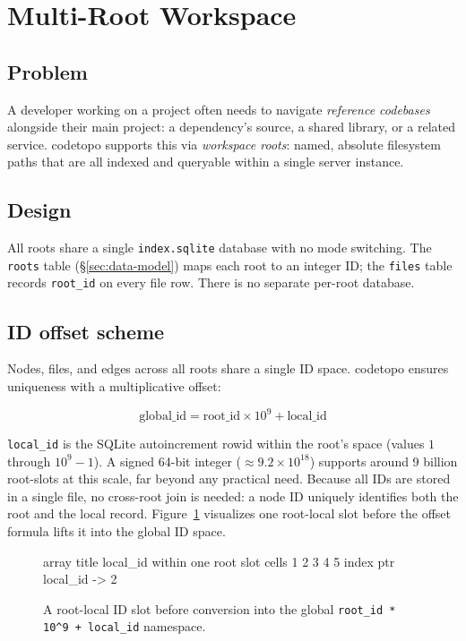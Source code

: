 \section{Multi-Root Workspace}
\label{sec:workspace}

\subsection{Problem}

A developer working on a project often needs to navigate \emph{reference
codebases} alongside their main project: a dependency's source, a shared
library, or a related service. codetopo supports this via \emph{workspace
roots}: named, absolute filesystem paths that are all indexed and queryable
within a single server instance.

\subsection{Design}

All roots share a single \texttt{index.sqlite} database with no mode
switching. The \texttt{roots} table (\S\ref{sec:data-model}) maps each root
to an integer ID; the \texttt{files} table records \texttt{root\_id} on every
file row. There is no separate per-root database.

\subsection{ID offset scheme}

Nodes, files, and edges across all roots share a single ID space. codetopo
ensures uniqueness with a multiplicative offset:

\[
  \text{global\_id} = \text{root\_id} \times 10^9 + \text{local\_id}
\]

\texttt{local\_id} is the SQLite autoincrement rowid within the root's space
(values $1$ through $10^9 - 1$). A signed 64-bit integer ($\approx 9.2 \times
10^{18}$) supports around 9 billion root-slots at this scale, far beyond any
practical need. Because all IDs are stored in a single file, no cross-root
join is needed: a node ID uniquely identifies both the root and the local
record. Figure~\ref{fig:id-offset-array} visualizes one root-local slot before
the offset formula lifts it into the global ID space.

\begin{figure}[htbp]
  \centering
\begin{triton}
array
  title local_id within one root slot
  cells 1 2 3 4 5
  index
  ptr local_id -> 2
\end{triton}
  \caption{A root-local ID slot before conversion into the global
           \texttt{root\_id * 10\^{}9 + local\_id} namespace.}
  \label{fig:id-offset-array}
\end{figure}

